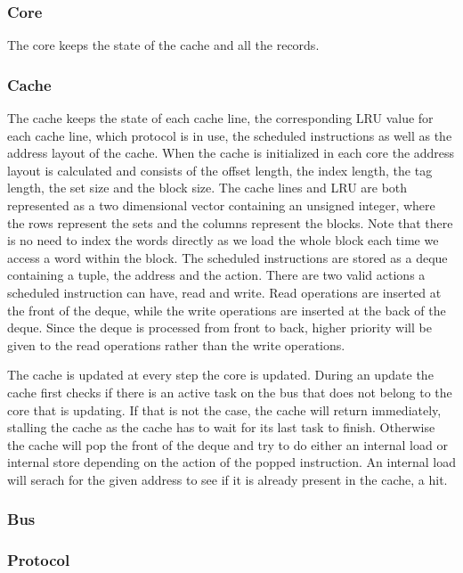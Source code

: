 \subsubsection{Core}
The core keeps the state of the cache and all the records.

\subsubsection{Cache}
The cache keeps the state of each cache line, the corresponding LRU value for each cache line, which protocol is in use, the scheduled instructions as well as the address layout of the cache.
When the cache is initialized in each core the address layout is calculated and consists of the offset length, the index length, the tag length, the set size and the block size.
The cache lines and LRU are both represented as a two dimensional vector containing an unsigned integer, where the rows represent the sets and the columns represent the blocks.
Note that there is no need to index the words directly as we load the whole block each time we access a word within the block.
The scheduled instructions are stored as a deque containing a tuple, the address and the action.
There are two valid actions a scheduled instruction can have, read and write.
Read operations are inserted at the front of the deque, while the write operations are inserted at the back of the deque.
Since the deque is processed from front to back, higher priority will be given to the read operations rather than the write operations.

The cache is updated at every step the core is updated.
During an update the cache first checks if there is an active task on the bus that does not belong to the core that is updating.
If that is not the case, the cache will return immediately, stalling the cache as the cache has to wait for its last task to finish.
Otherwise the cache will pop the front of the deque and try to do either an internal load or internal store depending on the action of the popped instruction.
An internal load will serach for the given address to see if it is already present in the cache, a hit.

\subsubsection{Bus}

\subsubsection{Protocol}

